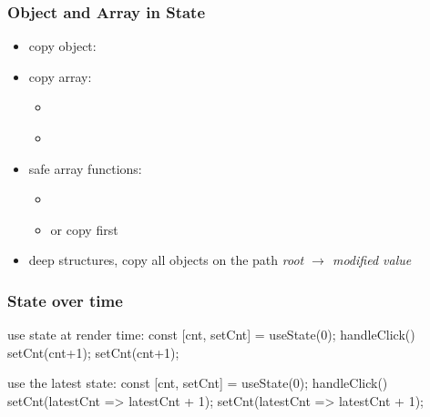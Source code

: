 \begin{frame}[fragile] \frametitle{Object and Array in State}
\begin{itemize}
  \item copy object: 
  \item copy array:
  \begin{itemize}
    \item {}
    \item {}\\
  \end{itemize}
  \item safe array functions: 
  \begin{itemize} 
    \item {}
    \item or copy first \code{[...arr]}
  \end{itemize}
  \item deep structures, copy all objects on the path \emph{root $\rightarrow$ modified value}\\ 
\end{itemize}
\end{frame}

\begin{frame}[fragile] \frametitle{State over time}
\begin{CodeBox}{use state at render time:}
const [cnt, setCnt] = useState(0);
handleClick(){
  setCnt(cnt+1);
  setCnt(cnt+1);
}
\end{CodeBox}

\begin{CodeBox}{use the latest state:}
const [cnt, setCnt] = useState(0);
handleClick(){
  setCnt(latestCnt => latestCnt + 1);
  setCnt(latestCnt => latestCnt + 1);
}
\end{CodeBox}
\end{frame}

